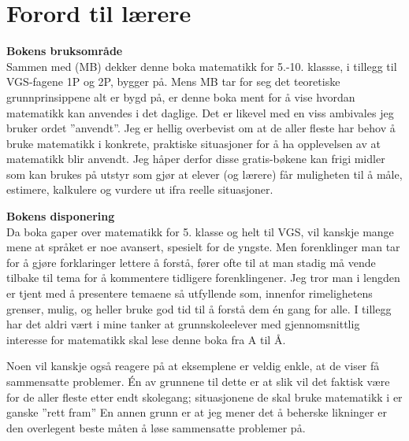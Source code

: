 


\section*{Forord til lærere}

\textbf{Bokens bruksområde}\\
Sammen med  (MB) dekker denne boka matematikk for 5.-10. klassse, i tillegg til VGS-fagene 1P og 2P, bygger på. Mens MB tar for seg det teoretiske grunnprinsippene alt er bygd på, er denne boka ment for å vise hvordan matematikk kan anvendes i det daglige. Det er likevel med en viss ambivales jeg bruker ordet ''anvendt''. Jeg er hellig overbevist om at de aller fleste har behov å bruke matematikk i konkrete, praktiske situasjoner for å ha opplevelsen av at matematikk blir anvendt. Jeg håper derfor disse gratis-bøkene kan frigi midler som kan brukes på utstyr som gjør at elever (og lærere) får muligheten til å måle, estimere, kalkulere og vurdere ut ifra reelle situasjoner.\vsk

\textbf{Bokens disponering} \\
Da boka gaper over matematikk for 5. klasse og helt til VGS, vil kanskje mange mene at språket er noe avansert, spesielt for de yngste. Men forenklinger man tar for å gjøre forklaringer lettere å forstå, fører ofte til at man stadig må vende tilbake til tema for å kommentere tidligere forenklingener. Jeg tror man i lengden er tjent med å presentere temaene så utfyllende som, innenfor rimelighetens grenser, mulig, og heller bruke god tid til å forstå dem én gang for alle. I tillegg har det aldri vært i mine tanker at grunnskoleelever med gjennomsnittlig interesse for matematikk skal lese denne boka fra A til Å. \vsk

Noen vil kanskje også reagere på at eksemplene er veldig enkle, at de viser få sammensatte problemer. Én av grunnene til dette er at slik vil det faktisk være for de aller fleste etter endt skolegang; situasjonene de skal bruke matematikk i er ganske ''rett fram'' En annen grunn er at jeg mener det å beherske likninger er den overlegent beste måten å løse sammensatte problemer på.


